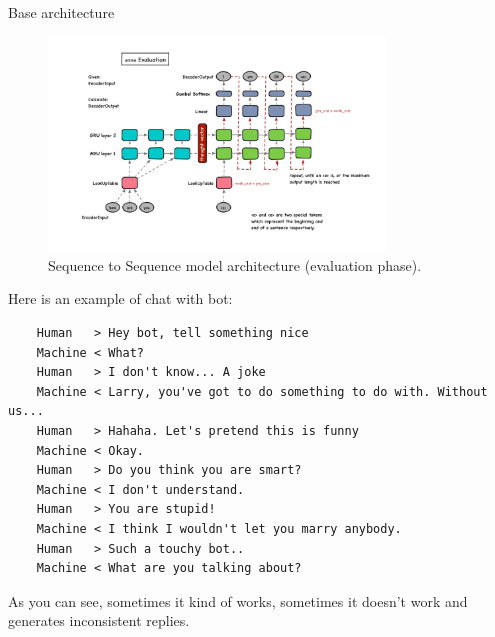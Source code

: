 \documentclass[12pt,a4paper]{article}
\begin{document}
\begin{section}{Base architecture}
\begin{figure}
    \centering
    \includegraphics[width=0.8\textwidth]{figures/generation.png}
    \caption{Sequence to Sequence model architecture (evaluation phase)\protect\footnotemark.}
    \label{fig:seq2seq_eval}
\end{figure}


Here is an example of chat with bot:
{\footnotesize{
\begin{verbatim}
    Human   > Hey bot, tell something nice
    Machine < What?
    Human   > I don't know... A joke
    Machine < Larry, you've got to do something to do with. Without us...
    Human   > Hahaha. Let's pretend this is funny
    Machine < Okay.
    Human   > Do you think you are smart?
    Machine < I don't understand.
    Human   > You are stupid!
    Machine < I think I wouldn't let you marry anybody.
    Human   > Such a touchy bot..
    Machine < What are you talking about?
\end{verbatim}
}
}
\normalsize
As you can see, sometimes it kind of works, sometimes it doesn't work and generates inconsistent replies.

\end{section}
\end{document}
